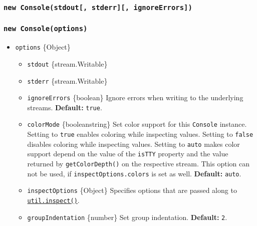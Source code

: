 \begin{Shaded}
\begin{Highlighting}[]
\NormalTok{ \{ }\NormalTok{ \} }\OperatorTok{=} \OperatorTok{;}
\end{Highlighting}
\end{Shaded}

\subsubsection{\texorpdfstring{\texttt{new\ Console(stdout{[},\ stderr{]}{[},\ ignoreErrors{]})}}{new Console(stdout{[}, stderr{]}{[}, ignoreErrors{]})}}\label{new-consolestdout-stderr-ignoreerrors}

\subsubsection{\texorpdfstring{\texttt{new\ Console(options)}}{new Console(options)}}\label{new-consoleoptions}

\begin{itemize}
\tightlist
\item
  \texttt{options} \{Object\}

  \begin{itemize}
  \tightlist
  \item
    \texttt{stdout} \{stream.Writable\}
  \item
    \texttt{stderr} \{stream.Writable\}
  \item
    \texttt{ignoreErrors} \{boolean\} Ignore errors when writing to the
    underlying streams. \textbf{Default:} \texttt{true}.
  \item
    \texttt{colorMode} \{boolean\textbar string\} Set color support for
    this \texttt{Console} instance. Setting to \texttt{true} enables
    coloring while inspecting values. Setting to \texttt{false} disables
    coloring while inspecting values. Setting to
    \texttt{\textquotesingle{}auto\textquotesingle{}} makes color
    support depend on the value of the \texttt{isTTY} property and the
    value returned by \texttt{getColorDepth()} on the respective stream.
    This option can not be used, if \texttt{inspectOptions.colors} is
    set as well. \textbf{Default:}
    \texttt{\textquotesingle{}auto\textquotesingle{}}.
  \item
    \texttt{inspectOptions} \{Object\} Specifies options that are passed
    along to
    \href{util.md\#utilinspectobject-options}{\texttt{util.inspect()}}.
  \item
    \texttt{groupIndentation} \{number\} Set group indentation.
    \textbf{Default:} \texttt{2}.
  \end{itemize}
\end{itemize}

